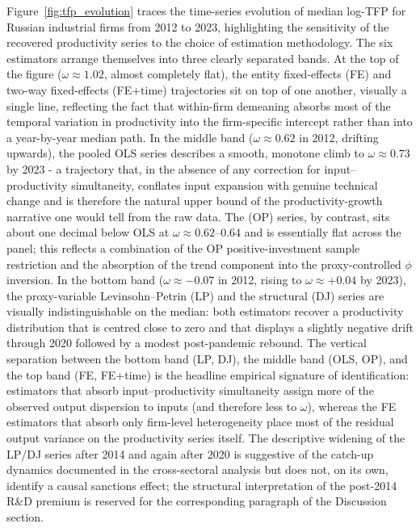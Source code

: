 \documentclass[a4paper, 12pt]{article}
\begin{document}
Figure~\ref{fig:tfp_evolution} \hypertarget{target:fig4}{} traces the time-series evolution of median log-TFP for Russian industrial firms from 2012 to 2023, highlighting the sensitivity of the recovered productivity series to the choice of estimation methodology. The six estimators arrange themselves into three clearly separated bands. At the top of the figure ($\omega \approx 1.02$, almost completely flat), the entity fixed-effects (FE) and two-way fixed-effects (FE+time) trajectories sit on top of one another, visually a single line, reflecting the fact that within-firm demeaning absorbs most of the temporal variation in productivity into the firm-specific intercept rather than into a year-by-year median path. In the middle band ($\omega \approx 0.62$ in 2012, drifting upwards), the pooled OLS series describes a smooth, monotone climb to $\omega \approx 0.73$ by 2023 - a trajectory that, in the absence of any correction for input--productivity simultaneity, conflates input expansion with genuine technical change and is therefore the natural upper bound of the productivity-growth narrative one would tell from the raw data. The \textcite{olley1992dynamics} (OP) series, by contrast, sits about one decimal below OLS at $\omega \approx 0.62$--$0.64$ and is essentially flat across the panel; this reflects a combination of the OP positive-investment sample restriction and the absorption of the trend component into the proxy-controlled $\phi$ inversion. In the bottom band ($\omega \approx -0.07$ in 2012, rising to $\omega \approx +0.04$ by 2023), the proxy-variable Levinsohn--Petrin (LP) and the structural \textcite{doraszelski2013r} (DJ) series are visually indistinguishable on the median: both estimators recover a productivity distribution that is centred close to zero and that displays a slightly negative drift through 2020 followed by a modest post-pandemic rebound. The vertical separation between the bottom band (LP, DJ), the middle band (OLS, OP), and the top band (FE, FE+time) is the headline empirical signature of identification: estimators that absorb input--productivity simultaneity assign more of the observed output dispersion to inputs (and therefore less to $\omega$), whereas the FE estimators that absorb only firm-level heterogeneity place most of the residual output variance on the productivity series itself. The descriptive widening of the LP/DJ series after 2014 and again after 2020 is suggestive of the catch-up dynamics documented in the cross-sectoral analysis but does not, on its own, identify a causal sanctions effect; the structural interpretation of the post-2014 R\&D premium is reserved for the corresponding paragraph of the Discussion section.
\end{document}
